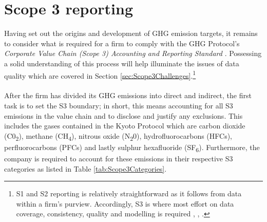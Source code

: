 \documentclass[12pt,twoside]{report}
\begin{document}
\section{Scope 3 reporting} \label{sec:Scope3Reporting}
Having set out the origins and development of GHG emission targets, it remains to consider what is required for a firm to comply with the GHG Protocol's  \textit{Corporate Value Chain (Scope 3) Accounting and Reporting Standard} \cite{ghgscope32013}. Possessing a solid understanding of this process will help illuminate the issues of data quality which are covered in Section \ref{sec:Scope3Challenges}.\footnote{S1 and S2 reporting is relatively straightforward as it follows from data within a firm's purview. Accordingly, S3 is where most effort on data coverage, consistency, quality and modelling is required \cite{ManGroup2022}, \cite{Papadopoulos2022}, \cite{ftserussell2024}.}
\\ \\
After the firm has divided its GHG emissions into direct and indirect, the first task is to set the S3 boundary; in short, this means accounting for all S3 emissions in the value chain and to disclose and justify any exclusions. This includes the gases contained in the Kyoto Protocol which are carbon dioxide (C0\textsubscript{2}), methane (CH\textsubscript{4}), nitrous oxide (N\textsubscript{2}0), hydrofluorocarbons (HFCs), perfluorocarbons (PFCs) and lastly sulphur hexafluoride (SF\textsubscript{6}). Furthermore, the company is required to account for these emissions in their respective S3 categories as listed in Table \ref{tab:Scope3Categories}.\\
\end{document}
